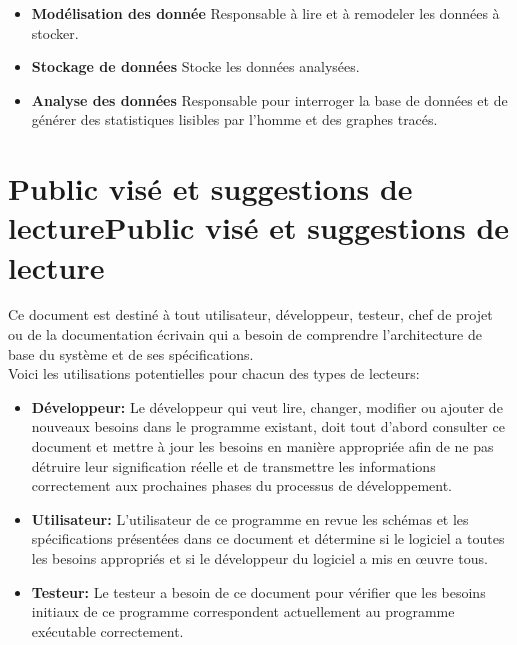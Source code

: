 \documentclass{scrreprt}
\begin{document}
\begin{itemize}
  \item \textbf{Modélisation des donnée} \- Responsable à lire et à remodeler les données à stocker.
  \item \textbf{Stockage de données} \- Stocke les données analysées.
  \item \textbf{Analyse des données} \- Responsable pour interroger la base de données et de générer des statistiques lisibles par l'homme et des graphes tracés.

\end{itemize}


 \section{Public visé et suggestions de lecturePublic visé et suggestions de lecture}

Ce document est destiné à tout utilisateur, développeur, testeur, chef de projet ou de la documentation écrivain qui a besoin de comprendre l'architecture de base du système et de ses spécifications.\\
Voici les utilisations potentielles pour chacun des types de lecteurs:\\
\begin{itemize}

\item \textbf{Développeur: }Le développeur qui veut lire, changer, modifier ou ajouter de nouveaux besoins dans le programme existant, doit tout d'abord consulter ce document et mettre à jour les besoins en manière appropriée afin de ne pas détruire leur signification réelle et de transmettre les informations correctement aux prochaines phases du processus de développement.\\

\item \textbf{Utilisateur: }L'utilisateur de ce programme en revue les schémas et les spécifications présentées dans ce document et détermine si le logiciel a toutes les besoins appropriés et si le développeur du logiciel a mis en œuvre tous.\\

\item \textbf{Testeur: }Le testeur a besoin de ce document pour vérifier que les besoins initiaux de ce programme correspondent actuellement  au programme exécutable correctement.\\
\end{itemize}
\end{document}
